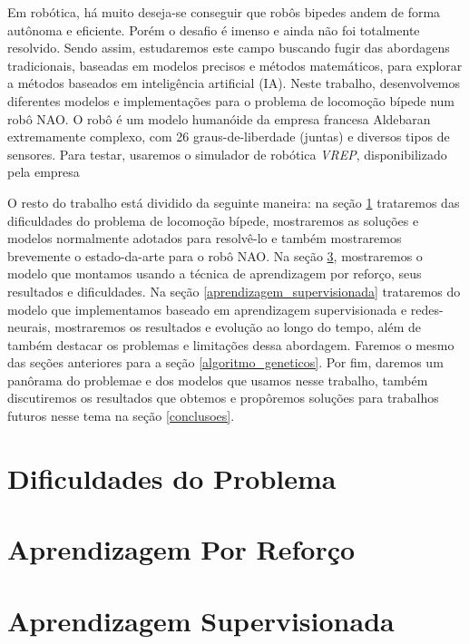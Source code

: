 \documentclass[twoside,conference,a4paper]{IEEEtran}
\begin{document}
Em robótica, há muito deseja-se conseguir que robôs bipedes andem de forma autônoma e eficiente. Porém o desafio é imenso e ainda não foi totalmente resolvido. Sendo assim, estudaremos este campo buscando fugir das abordagens tradicionais, baseadas em modelos precisos e métodos matemáticos, para explorar a métodos baseados em inteligência artificial (IA). 
Neste trabalho, desenvolvemos diferentes modelos e implementações para o problema de locomoção bípede num robô NAO. O robô é um modelo humanóide da empresa francesa Aldebaran extremamente complexo, com 26 graus-de-liberdade (juntas) e diversos tipos de sensores.  Para testar, usaremos o simulador de robótica \textsl{VREP}, disponibilizado pela empresa %


O resto do trabalho está dividido da seguinte maneira: na seção \ref{dificuldades} trataremos das dificuldades do problema de locomoção bípede, mostraremos as soluções e modelos normalmente adotados para resolvê-lo e também mostraremos brevemente o estado-da-arte para o robô NAO.
Na seção \ref{aprendizagem_por_reforco}, mostraremos o modelo que montamos usando a técnica de aprendizagem por reforço, seus resultados e dificuldades. Na seção \ref{aprendizagem_supervisionada} trataremos do modelo que implementamos baseado em aprendizagem supervisionada e redes-neurais, mostraremos os resultados e evolução ao longo do tempo, além de também destacar os problemas e limitações dessa abordagem. Faremos o mesmo das seções anteriores para a seção \ref{algoritmo_geneticos}. Por fim, daremos um panôrama do problemae e dos modelos que usamos nesse trabalho, também discutiremos os resultados que obtemos e propôremos soluções para trabalhos futuros nesse tema na seção \ref{conclusoes}.



 \section{Dificuldades do Problema} \label{dificuldades}


 \section{Aprendizagem Por Reforço} \label{aprendizagem_por_reforco}
 

 \section{Aprendizagem Supervisionada} \label{aprendizagem_por_reforco}
 
\end{document}
